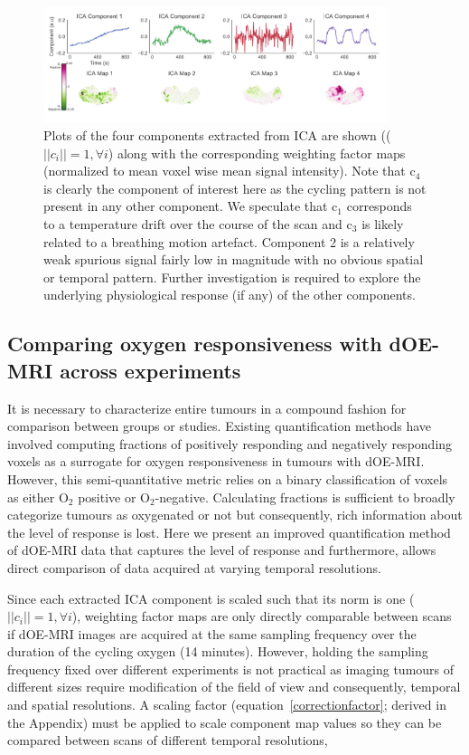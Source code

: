 \begin{figure}[htbp]
   \centering
   \includegraphics[width=0.9\textwidth]{oemri_thesis1/oemri_thesis1-images/fig_components.pdf} %
   \caption{Plots of the four components extracted from \ac{ICA} are shown (($||c_i||=1, \forall i $) along with the corresponding  weighting factor maps (normalized to mean voxel wise mean signal intensity). Note that c$_4$ is clearly the component of interest here as the cycling pattern is not present in any other component. We speculate that c$_1$ corresponds to a temperature drift over the course of the scan and c$_3$ is likely related to a breathing motion artefact. Component 2 is a relatively weak spurious signal fairly low in magnitude with no obvious spatial or temporal pattern. Further investigation is required to explore the underlying physiological response (if any) of the other components.
   \label{Sfig_components}}
\end{figure}

\subsection{Comparing oxygen responsiveness with \ac{dOE-MRI} across experiments}
\label{sec:correctionfactor}
It is necessary to characterize entire tumours in a compound fashion for comparison between groups or studies. 
Existing quantification methods have involved computing fractions of positively responding and negatively responding voxels as a surrogate for oxygen responsiveness in tumours with \ac{dOE-MRI}.
However, this semi-quantitative metric relies on a binary classification of voxels as either O$_2$ positive or O$_2$-negative.
Calculating fractions is sufficient to broadly categorize tumours as oxygenated or not but consequently, rich information about the level of response is lost.
Here we present an improved quantification method of \ac{dOE-MRI} data that captures the level of response and furthermore, allows direct comparison of data acquired at varying temporal resolutions.

Since each extracted \ac{ICA} component is scaled such that its norm is one ($||c_i||=1, \forall i $), weighting factor maps are only directly comparable between scans if \ac{dOE-MRI} images are acquired at the same sampling frequency over the duration of the cycling oxygen (14 minutes).
However, holding the sampling frequency fixed over different experiments is not practical as imaging tumours of different sizes require modification of the field of view and consequently, temporal and spatial resolutions.
A scaling factor (equation~\ref{correctionfactor}; derived in the Appendix) must be applied to scale component map values so they can be compared between scans of different temporal resolutions,

